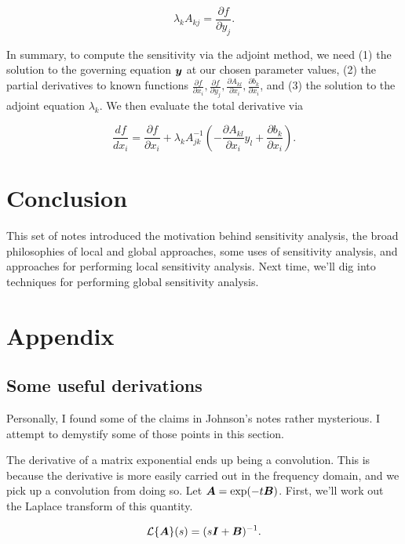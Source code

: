 \documentclass[../primer.tex]{subfiles}
\begin{document}
\begin{equation}\label{eq:linear-adjoint}
\lambda_k A_{kj} = \frac{\partial f}{\partial y_j}.
\end{equation}

In summary, to compute the sensitivity via the adjoint method, we need (1) the
solution to the governing equation \(\boldsymbol{y}\) at our chosen parameter values, (2) the
partial derivatives to known functions \(\frac{\partial f}{\partial x_i},
\frac{\partial f}{\partial y_j}, \frac{\partial A_{kl}}{\partial x_i},
\frac{\partial b_k}{\partial x_i}\), and (3) the solution to the adjoint equation
\(\lambda_k\). We then evaluate the total derivative via

\begin{equation}
\frac{df}{dx_i} = \frac{\partial f}{\partial x_i} + \lambda_k A^{-1}_{jk}\left(-\frac{\partial A_{kl}}{\partial x_i}y_l + \frac{\partial b_k}{\partial x_i}\right).
\end{equation}

\section{Conclusion}
\label{sec:org9f00d47}
This set of notes introduced the motivation behind sensitivity analysis, the
broad philosophies of local and global approaches, some uses of sensitivity
analysis, and approaches for performing local sensitivity analysis. Next time,
we'll dig into techniques for performing global sensitivity analysis.

\section{Appendix}
\label{sec:org880d431}
\subsection{Some useful derivations}
\label{sec:org1df2b75}
Personally, I found some of the claims in Johnson's notes rather
mysterious.\cite{johnson2012} I attempt to demystify some of those points in this
section.

The derivative of a matrix exponential ends up being a convolution. This is
because the derivative is more easily carried out in the frequency domain, and
we pick up a convolution from doing so. Let \(\boldsymbol{A}=\exp(-t\boldsymbol{B})\). First,
we'll work out the Laplace transform of this quantity.

\begin{equation}
  \mathcal{L}\{\boldsymbol{A}\}(s) = (s\boldsymbol{I}+\boldsymbol{B})^{-1}.
\end{equation}
\end{document}
